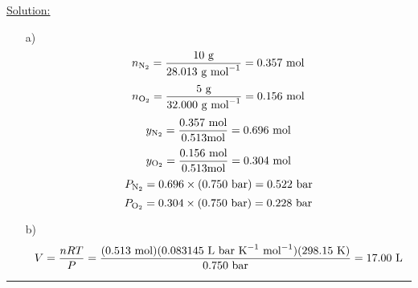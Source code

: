 \noindent
\underline{Solution:}\\

\begin{itemize}

\item[a)] $$n_{\textnormal{N}_2} = \frac{10\textnormal{ g}}{28.013\textnormal{ g mol}^{-1}} = 0.357\textnormal{ mol}$$
$$n_{\textnormal{O}_2} = \frac{5\textnormal{ g}}{32.000\textnormal{ g mol}^{-1}} = 0.156\textnormal{ mol}$$
$$y_{\textnormal{N}_2} = \frac{0.357\textnormal{ mol}}{0.513\textnormal{mol}} = 0.696\textnormal{ mol}$$
$$y_{\textnormal{O}_2} = \frac{0.156\textnormal{ mol}}{0.513\textnormal{mol}} = 0.304\textnormal{ mol}$$
$$P_{\textnormal{N}_2} = 0.696\times(0.750\textnormal{ bar}) = 0.522\textnormal{ bar}$$
$$P_{\textnormal{O}_2} = 0.304\times(0.750\textnormal{ bar}) = 0.228\textnormal{ bar}$$

\item[b)] $$V = \frac{nRT}{P} = \frac{(0.513\textnormal{ mol})(0.083145\textnormal{ L bar K}^{-1}\textnormal{ mol}^{-1})(298.15\textnormal{ K})}{0.750\textnormal{ bar}} = 17.00\textnormal{ L}$$

\end{itemize}

\hrule\vspace{0.5cm}
